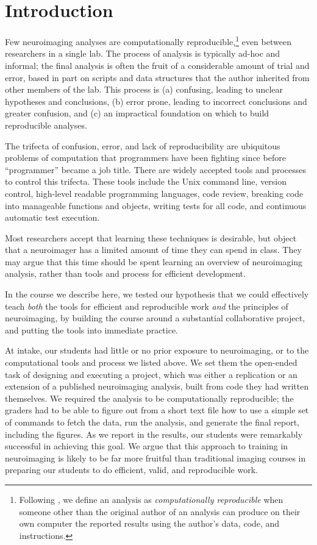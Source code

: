 \section{Introduction}

Few neuroimaging analyses are computationally reproducible,\footnote{Following
\citet{buckheit1995wavelab}, we define an analysis as \emph{computationally
reproducible} when someone other than the original author of an analysis can
produce on their own computer the reported results using the author's data,
code, and instructions.}
even between researchers in a single lab.
The process of analysis is typically ad-hoc and informal; the final analysis
is often the fruit of a considerable amount of trial and error, based in part
on scripts and data structures that the author inherited from other members of
the lab.
This process is
(a) confusing, leading to unclear hypotheses and conclusions,
(b) error prone, leading to incorrect conclusions and greater confusion,
and (c) an impractical foundation on which to build reproducible analyses.

The trifecta of confusion, error, and lack of reproducibility are ubiquitous
problems of computation that programmers have been fighting since before ``programmer''
became a job title. There are widely accepted tools and processes to
control this trifecta. These tools include the Unix command line, version
control, high-level readable programming languages, code review, breaking code
into manageable functions and objects, writing tests for all code,  and
continuous automatic test execution.

Most researchers accept that learning these techniques is desirable, but
object that a neuroimager has a limited amount of time they can spend in
class.  They may argue that this time should be spent learning an overview of
neuroimaging analysis, rather than tools and process for efficient
development.

In the course we describe here, we tested our hypothesis that we could
effectively teach \emph{both} the tools for efficient and reproducible work \emph{and}
the principles of neuroimaging, by building the course around a substantial
collaborative project, and putting the tools into immediate practice.

At intake, our students had little or no prior exposure to neuroimaging,
or to the computational tools and process we listed above.  We set them the
open-ended task of designing and executing a project, which was either a
replication or an extension of a published neuroimaging analysis, built from
code they had written themselves.  We required the analysis to be computationally
reproducible; the graders had to be able to figure out from a short text file
how to use a simple set of commands to
fetch the data, run the analysis, and generate the final report, including the
figures.  As we report in the results, our students were remarkably
successful in achieving this goal.  We argue that this approach to
training in neuroimaging is likely to be far more fruitful than traditional
imaging courses in preparing our students to do efficient, valid, and
reproducible work.

